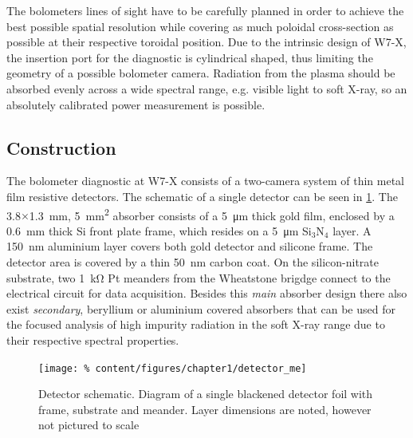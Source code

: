             The bolometers lines of sight have to be carefully planned in order to achieve the best possible spatial resolution while covering as much poloidal cross-section as possible at their respective toroidal position. Due to the intrinsic design of W7-X, the insertion port for the diagnostic is cylindrical shaped, thus limiting the geometry of a possible bolometer camera. Radiation from the plasma should be absorbed evenly across a wide spectral range, e.g. visible light to soft X-ray, so an absolutely calibrated power measurement is possible.%
%
        \subsection{Construction}\label{subsec:construction}%

            The bolometer diagnostic at W7-X consists of a two-camera system of thin metal film resistive detectors. The schematic of a single detector can be seen in \cref{fig:detector_me}. The 3.8$\times$\SI{1.3}{\milli\meter}, \SI{5}{\milli\meter\squared} absorber consists of a \mbox{\SI{5}{\micro\meter}} thick gold film, enclosed by a \mbox{\SI{0.6}{\milli\meter}} thick Si front plate frame, which resides on a \mbox{\SI{5}{\micro\meter}} Si$_{3}$N$_{4}$ layer. A \mbox{\SI{150}{\nano\meter}} aluminium layer covers both gold detector and silicone frame. The detector area is covered by a thin \mbox{\SI{50}{\nano\meter}} carbon coat. On the silicon-nitrate substrate, two \mbox{\SI{1}{\kilo\ohm}} Pt meanders from the Wheatstone brigdge connect to the electrical circuit for data acquisition. Besides this \textit{main} absorber design there also exist \textit{secondary}, beryllium or aluminium covered absorbers that can be used for the focused analysis of high impurity radiation in the soft X-ray range due to their respective spectral properties.\\%
%
            \begin{figure}[t]%
                \centering%
                \texttt{[image: \%
                    content/figures/chapter1/detector\_me]}%
                \caption{%
                    Detector schematic. Diagram of a single blackened detector foil with frame, substrate and meander. Layer dimensions are noted, however not pictured to scale}\label{fig:detector_me}%
            \end{figure}%
%
